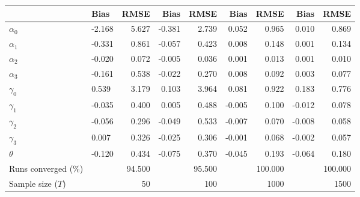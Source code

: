 
\begin{tabular}[t]{llrrrrrrr}
\toprule
  & Bias & RMSE & Bias & RMSE & Bias & RMSE & Bias & RMSE\\
\midrule
$\alpha_{0}$ & -2.168 & 5.627 & -0.381 & 2.739 & 0.052 & 0.965 & 0.010 & 0.869\\
$\alpha_{1}$ & -0.331 & 0.861 & -0.057 & 0.423 & 0.008 & 0.148 & 0.001 & 0.134\\
$\alpha_{2}$ & -0.020 & 0.072 & -0.005 & 0.036 & 0.001 & 0.013 & 0.001 & 0.010\\
$\alpha_{3}$ & -0.161 & 0.538 & -0.022 & 0.270 & 0.008 & 0.092 & 0.003 & 0.077\\
$\gamma_{0}$ & 0.539 & 3.179 & 0.103 & 3.964 & 0.081 & 0.922 & 0.183 & 0.776\\
$\gamma_{1}$ & -0.035 & 0.400 & 0.005 & 0.488 & -0.005 & 0.100 & -0.012 & 0.078\\
$\gamma_{2}$ & -0.056 & 0.296 & -0.049 & 0.533 & -0.007 & 0.070 & -0.008 & 0.058\\
$\gamma_{3}$ & 0.007 & 0.326 & -0.025 & 0.306 & -0.001 & 0.068 & -0.002 & 0.057\\
$\theta$ & -0.120 & 0.434 & -0.075 & 0.370 & -0.045 & 0.193 & -0.064 & 0.180\\
Runs converged (\%) &  & 94.500 &  & 95.500 &  & 100.000 &  & 100.000\\
Sample size ($T$) &  & 50 &  & 100 &  & 1000 &  & 1500\\
\bottomrule
\end{tabular}
